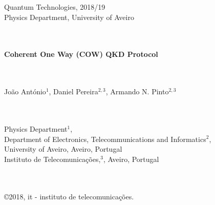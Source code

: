\documentclass[1000pt]{article}
\begin{document}
\begin{titlepage}  

\color{itblue} \sffamily \noindent \normalsize
\hspace*{4cm} Quantum Technologies, 2018/19\\
\hspace*{4cm} Physics Department, University of Aveiro\\
\\
\\
\hspace*{6.5cm}\begin{minipage}{15in}
\vspace*{2cm}
\begin{flushleft}
 \color{title} \sffamily \noindent \Huge
\textbf{Coherent One Way (COW) QKD Protocol}
\end{flushleft}
\end{minipage}
\vspace*{2cm}\\
\\
\hspace*{6.5cm}
\color{author}
\Large João António$^1$, Daniel Pereira$^{2,3}$, Armando N. Pinto$^{2,3}$\\
\\
\vspace*{2cm}\\
\hspace*{6.5cm}
\begin{minipage}{12cm}
\color{title}
\large Physics Department$^1$,\\
Department of Electronics, Telecommunications and Informatics$^2$,\\
University of Aveiro, Aveiro, Portugal\\
Instituto de Telecomunica\c{c}\~{o}es,$^3$, Aveiro, Portugal
\end{minipage}\
\\
\vspace*{2cm}
\\[-1.5mm]
\hspace*{11in}\large \copyright 2018, it - instituto de
telecomunica\c{c}\~{o}es.

\end{titlepage}
\end{document}
